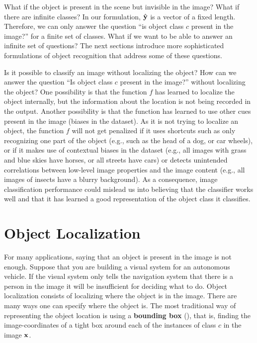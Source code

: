 What if the object is present in the scene but invisible in the image? What if there are infinite classes? In our formulation, $\hat {\bf y}$ is a vector of a fixed length. Therefore, we can only answer the question ``is object class $c$ present in the image?'' for a finite set of classes. What if we want to be able to answer an infinite set of questions? The next sections introduce more sophisticated formulations of object recognition that address some of these questions.


Is it possible to classify an image without localizing the object? How can we answer  the question ``Is object class $c$ present in the image?'' without localizing the object? One possibility is that the function $f$ has learned to localize the object internally, but the information about the location is not being recorded in the output. Another possibility is that the function has learned to use other cues present in the image (biases in the dataset). As it is not trying to localize an object, the function $f$ will not get penalized if it uses shortcuts such as only recognizing one part of the object (e.g., such as the head of a dog, or car wheels), or if it makes use of contextual biases in the dataset (e.g., all images with grass and blue skies have horses, or all streets have cars) or detects unintended correlations between low-level image properties and the image content (e.g., all images of insects have a blurry background). As a consequence, image classification performance could mislead us into believing that the classifier works well and that it has learned a good representation of the object class it classifies. 




\section{Object Localization}

For many applications, saying that an object is present in the image is not enough. Suppose that you are building a visual system for an autonomous vehicle. If the visual system only tells the navigation system that there is a person in the image it will be insufficient for deciding what to do. Object localization consists of localizing where the object is in the image. There are many ways one can specify where the object is. The most traditional way of representing the object location is using a {\bf bounding box} 
(\fig{\ref{fig:object_detection_bb}}), that is, finding the image-coordinates of a tight box around each of the instances of class $c$ in the image $\bf x$.



